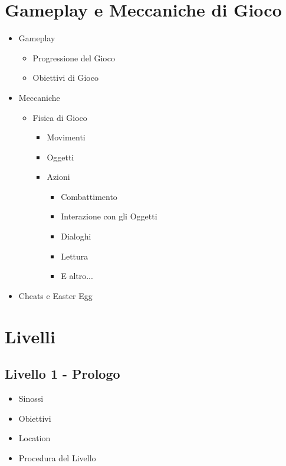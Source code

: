 \documentclass{report}
\begin{document}
\section{Gameplay e Meccaniche di Gioco}
\begin{itemize}
    \item Gameplay
    \begin{itemize}
        \item Progressione del Gioco
        \item Obiettivi di Gioco
    \end{itemize}
    \item Meccaniche
    \begin{itemize}
        \item Fisica di Gioco
        \begin{itemize}
            \item Movimenti
            \item Oggetti
            \item Azioni
            \begin{itemize}
                \item Combattimento
                \item Interazione con gli Oggetti
                \item Dialoghi
                \item Lettura
                \item E altro...
            \end{itemize}
        \end{itemize}
    \end{itemize}
    \item Cheats e Easter Egg
\end{itemize}

\section{Livelli}
\subsection{Livello 1 - Prologo}
\begin{itemize}
    \item Sinossi
    \item Obiettivi
    \item Location
    \item Procedura del Livello
\end{itemize}
\end{document}
